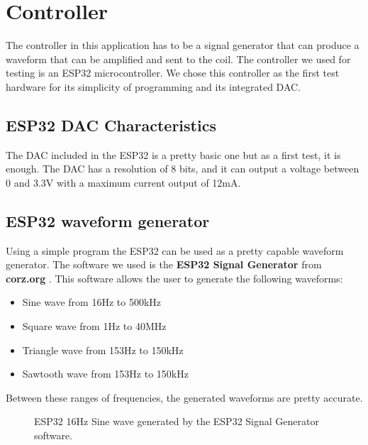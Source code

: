 \section{Controller}
The controller in this application has to be a signal generator that can produce a waveform that can be amplified and sent to the coil.
The controller we used for testing is an ESP32 microcontroller.
We chose this controller as the first test hardware for its simplicity of programming and its integrated DAC.

\subsection{ESP32 DAC Characteristics}
The DAC included in the ESP32 is a pretty basic one but as a first test, it is enough.
The DAC has a resolution of 8 bits, and it can output a voltage between 0 and 3.3V with a maximum current output of 12mA.

\subsection{ESP32 waveform generator}
Using a simple program the ESP32 can be used as a pretty capable waveform generator.
The software we used is the \textbf{ESP32 Signal Generator} from \textbf{corz.org} \cite{corz_signal_gen}.
This software allows the user to generate the following waveforms:
\begin{itemize}
    \item Sine wave from 16Hz to 500kHz
    \item Square wave from 1Hz to 40MHz
    \item Triangle wave from 153Hz to 150kHz 
    \item Sawtooth wave from 153Hz to 150kHz
\end{itemize}
Between these ranges of frequencies, the generated waveforms are pretty accurate.

\begin{figure}
    \centering
    \caption{ESP32 16Hz Sine wave generated by the ESP32 Signal Generator software.}
    \label{fig:16Hz_signal_gen}
\end{figure}


